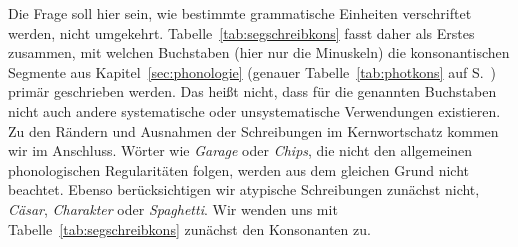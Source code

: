 \label{sec:konssegschreib}

Die Frage soll hier sein, wie bestimmte grammatische Einheiten verschriftet werden, nicht umgekehrt.
Tabelle~\ref{tab:segschreibkons} fasst daher als Erstes zusammen, mit welchen Buchstaben (hier nur die Minuskeln) die konsonantischen Segmente aus Kapitel~\ref{sec:phonologie} (genauer Tabelle~\ref{tab:photkons} auf S.~\pageref{tab:photkons}) primär geschrieben werden.
Das heißt nicht, dass für die genannten Buchstaben nicht auch andere systematische oder unsystematische Verwendungen existieren.
Zu den Rändern und Ausnahmen der Schreibungen im Kernwortschatz kommen wir im Anschluss.
Wörter wie \textit{Garage} oder \textit{Chips}, die nicht den allgemeinen phonologischen Regularitäten folgen, werden aus dem gleichen Grund nicht beachtet.
Ebenso berücksichtigen wir atypische Schreibungen zunächst nicht, \zB \textit{Cäsar}, \textit{Charakter} oder \textit{Spaghetti}.
Wir wenden uns mit Tabelle~\ref{tab:segschreibkons} zunächst den Konsonanten zu.

